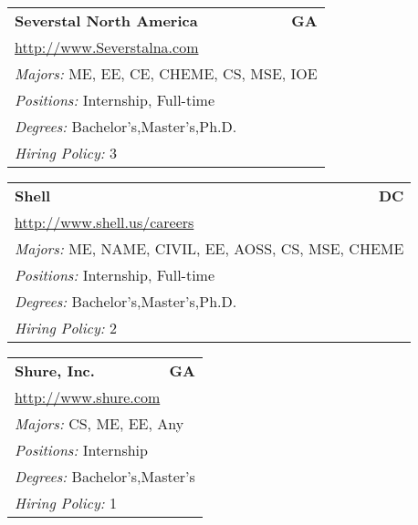\documentclass[twoside]{article}
\begin{document}
\begin{center}
\begin{multicols}{3}
\begin{FlushLeft}
\begin{minipage}{.9\columnwidth}
\end{minipage}
 
\begin{minipage}{.9\columnwidth}\begin{tabularx}{.95\columnwidth}{Xr}
                 {\Large\bf Severstal North America} & {\Large\bf GA}\\
    \multicolumn{2}{p{.95\columnwidth}}{\url{http://www.Severstalna.com}}\\
    \multicolumn{2}{p{.95\columnwidth}}{\emph{Majors:} ME, EE, CE, CHEME, CS, MSE, IOE}\\
    \multicolumn{2}{p{.95\columnwidth}}{\emph{Positions:} Internship, Full-time}\\
    \multicolumn{2}{p{.95\columnwidth}}{\emph{Degrees:} Bachelor's,Master's,Ph.D.}\\
    \multicolumn{2}{p{.95\columnwidth}}{\emph{Hiring Policy:} 3}\\
    \end{tabularx}
    
\end{minipage}
 
\begin{minipage}{.9\columnwidth}\begin{tabularx}{.95\columnwidth}{Xr}
                 {\Large\bf Shell} & {\Large\bf DC}\\
    \multicolumn{2}{p{.95\columnwidth}}{\url{http://www.shell.us/careers}}\\
    \multicolumn{2}{p{.95\columnwidth}}{\emph{Majors:} ME, NAME, CIVIL, EE, AOSS, CS, MSE, CHEME}\\
    \multicolumn{2}{p{.95\columnwidth}}{\emph{Positions:} Internship, Full-time}\\
    \multicolumn{2}{p{.95\columnwidth}}{\emph{Degrees:} Bachelor's,Master's,Ph.D.}\\
    \multicolumn{2}{p{.95\columnwidth}}{\emph{Hiring Policy:} 2}\\
    \end{tabularx}
    
\end{minipage}
 
\begin{minipage}{.9\columnwidth}\begin{tabularx}{.95\columnwidth}{Xr}
                 {\Large\bf Shure, Inc.} & {\Large\bf GA}\\
    \multicolumn{2}{p{.95\columnwidth}}{\url{http://www.shure.com}}\\
    \multicolumn{2}{p{.95\columnwidth}}{\emph{Majors:} CS, ME, EE, Any}\\
    \multicolumn{2}{p{.95\columnwidth}}{\emph{Positions:} Internship}\\
    \multicolumn{2}{p{.95\columnwidth}}{\emph{Degrees:} Bachelor's,Master's}\\
    \multicolumn{2}{p{.95\columnwidth}}{\emph{Hiring Policy:} 1}\\
    \end{tabularx}
    

\end{minipage}
\end{FlushLeft}
\end{multicols}
\end{center}
\end{document}
